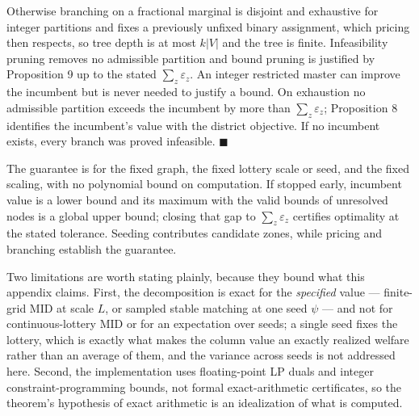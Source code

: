 \documentclass{article}
\begin{document}
Otherwise branching on a fractional marginal is disjoint and exhaustive for
integer partitions and fixes a previously unfixed binary assignment, which
pricing then respects, so tree depth is at most $k|V|$ and the tree is finite.
Infeasibility pruning removes no admissible partition and bound pruning is
justified by Proposition 9 up to the stated $\sum_z \varepsilon_z$. An integer
restricted master can improve the incumbent but is never needed to justify a
bound. On exhaustion no admissible partition exceeds the incumbent by more than
$\sum_z \varepsilon_z$; Proposition 8 identifies the incumbent's value with the
district objective. If no incumbent exists, every branch was proved infeasible.
$\blacksquare$

The guarantee is for the fixed graph, the fixed lottery scale or seed, and the
fixed scaling, with no polynomial bound on computation. If stopped early,
incumbent value is a lower bound and its maximum with the valid bounds of
unresolved nodes is a global upper bound; closing that gap to
$\sum_z \varepsilon_z$ certifies optimality at the stated tolerance. Seeding
contributes candidate zones, while pricing and branching establish the
guarantee.

Two limitations are worth stating plainly, because they bound what this appendix
claims. First, the decomposition is exact for the \emph{specified} value ---
finite-grid MID at scale $L$, or sampled stable matching at one seed $\psi$ ---
and not for continuous-lottery MID or for an expectation over seeds; a single
seed fixes the lottery, which is exactly what makes the column value an exactly
realized welfare rather than an average of them, and the variance across seeds
is not addressed here. Second, the implementation uses floating-point LP duals
and integer constraint-programming bounds, not formal exact-arithmetic
certificates, so the theorem's hypothesis of exact arithmetic is an idealization
of what is computed.
\end{document}
